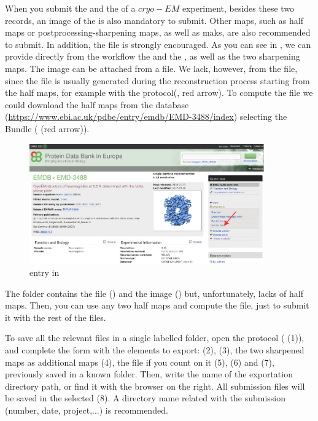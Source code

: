 When you submit the  and the  of a $cryo-EM$ experiment, besides these two records, an image of the  is also mandatory to submit. Other maps, such as half maps or postprocessing-sharpening maps, as well as maks, are also recommended to submit. In addition, the  file is strongly encouraged. As you can see in , we can provide directly from the workflow the  and the , as well as the two sharpening maps. The  image can be attached from a file. We lack, however, from the  file, since the  file is usually generated during the  reconstruction process starting from the half maps, for example with the  protocol(, red arrow). To compute the  file we could download the half maps from the database 
(\url{https://www.ebi.ac.uk/pdbe/entry/emdb/EMD-3488/index}) selecting the  Bundle ( (red arrow)).

 \begin{figure}[H]
  \centering 
  \captionsetup{width=.9\linewidth} 
  \includegraphics[width=0.9\textwidth]{Images/Fig77}
  \caption{ entry  in }
  \label{fig:export_to_EMDB_protocol_1}
  \end{figure}

The  folder contains the  file () and the  image () but, unfortunately, lacks of half maps. Then, you can use any two half maps and compute the  file, just to submit it with the rest of the files.
  
To save all the relevant files in a single labelled folder, open the  protocol ( (1)), and complete the form with the \scipion elements to export:  (2),  (3), the two sharpened maps as additional maps (4), the  file if you count on it (5),  (6) and  (7), previously saved in a known folder. Then, write the name of the exportation directory path, or find it with the browser on the right. All submission files will be saved in the  selected (8). A directory name related with the submission (number, date, project,...) is recommended. 
 
